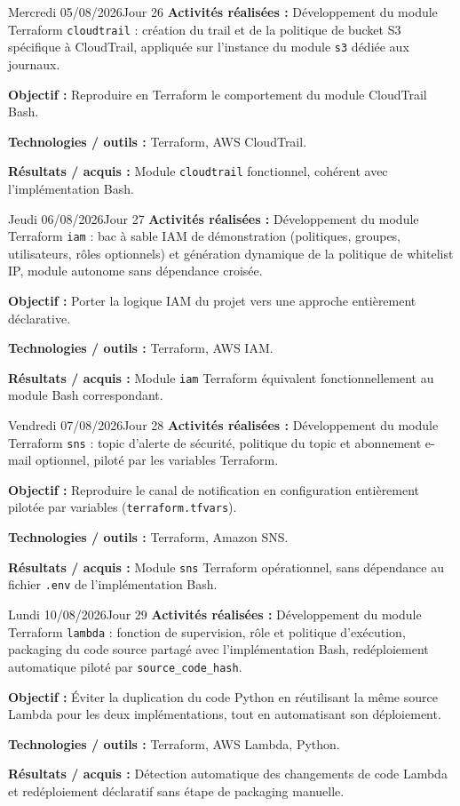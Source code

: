 \documentclass[11pt,a4paper]{article}
\newcommand{\journalfield}[2]{{\color{primaryblue}\textbf{#1 :}} #2\par\smallskip}
\begin{document}
\begin{journalday}{Mercredi 05/08/2026}{Jour 26}
\journalfield{Activités réalisées}{Développement du module Terraform \texttt{cloudtrail} : création du trail et de la politique de bucket S3 spécifique à CloudTrail, appliquée sur l'instance du module \texttt{s3} dédiée aux journaux.}
\journalfield{Objectif}{Reproduire en Terraform le comportement du module CloudTrail Bash.}
\journalfield{Technologies / outils}{Terraform, AWS CloudTrail.}
\journalfield{Résultats / acquis}{Module \texttt{cloudtrail} fonctionnel, cohérent avec l'implémentation Bash.}
\end{journalday}

\begin{journalday}{Jeudi 06/08/2026}{Jour 27}
\journalfield{Activités réalisées}{Développement du module Terraform \texttt{iam} : bac à sable IAM de démonstration (politiques, groupes, utilisateurs, rôles optionnels) et génération dynamique de la politique de whitelist IP, module autonome sans dépendance croisée.}
\journalfield{Objectif}{Porter la logique IAM du projet vers une approche entièrement déclarative.}
\journalfield{Technologies / outils}{Terraform, AWS IAM.}
\journalfield{Résultats / acquis}{Module \texttt{iam} Terraform équivalent fonctionnellement au module Bash correspondant.}
\end{journalday}

\begin{journalday}{Vendredi 07/08/2026}{Jour 28}
\journalfield{Activités réalisées}{Développement du module Terraform \texttt{sns} : topic d'alerte de sécurité, politique du topic et abonnement e-mail optionnel, piloté par les variables Terraform.}
\journalfield{Objectif}{Reproduire le canal de notification en configuration entièrement pilotée par variables (\texttt{terraform.tfvars}).}
\journalfield{Technologies / outils}{Terraform, Amazon SNS.}
\journalfield{Résultats / acquis}{Module \texttt{sns} Terraform opérationnel, sans dépendance au fichier \texttt{.env} de l'implémentation Bash.}
\end{journalday}

\begin{journalday}{Lundi 10/08/2026}{Jour 29}
\journalfield{Activités réalisées}{Développement du module Terraform \texttt{lambda} : fonction de supervision, rôle et politique d'exécution, packaging du code source partagé avec l'implémentation Bash, redéploiement automatique piloté par \texttt{source\_code\_hash}.}
\journalfield{Objectif}{Éviter la duplication du code Python en réutilisant la même source Lambda pour les deux implémentations, tout en automatisant son déploiement.}
\journalfield{Technologies / outils}{Terraform, AWS Lambda, Python.}
\journalfield{Résultats / acquis}{Détection automatique des changements de code Lambda et redéploiement déclaratif sans étape de packaging manuelle.}
\end{journalday}
\end{document}
